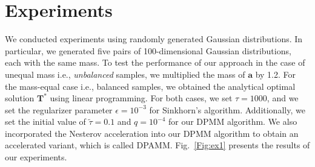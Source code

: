 \documentclass[conference]{IEEEtran}
\newcommand{\mat}[1]{\mathbf{#1}}
\renewcommand{\vec}[1]{\bm{#1}}
\begin{document}
\section{Experiments}

We conducted experiments using randomly generated Gaussian distributions. In particular, we generated five pairs of 100-dimensional Gaussian distributions, each with the same mass. To test the performance of our approach in the case of unequal mass i.e., {\it unbalanced} samples, we multiplied the mass of $\vec a$ by 1.2. For the mass-equal case i.e., balanced samples, we obtained the analytical optimal solution $\mat T^{*}$ using linear programming. For both cases, we set $\tau = 1000$, and we set the regularizer parameter $\epsilon = 10^{-3}$ for Sinkhorn's algorithm. Additionally, we set the initial value of $\tilde{\tau} = 0.1$ and $q = 10^{-4}$ for our DPMM algorithm. We also incorporated the Nesterov acceleration into our DPMM algorithm to obtain an accelerated variant, which is called DPAMM. Fig.~\ref{Fig:ex1} presents the results of our experiments.
\end{document}
